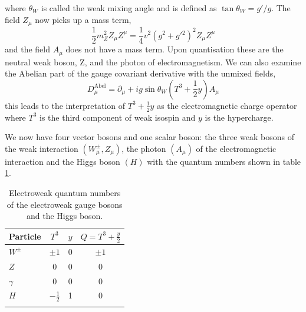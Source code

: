 where $\theta_{W}$ is called the weak mixing angle and is defined as $\tan{\theta_{W}} = g'/g$. The field $Z_{\mu}$ now picks up a mass term,
\begin{equation}
    \frac{1}{2} m_{Z}^{2} Z_{\mu} Z^{\mu} = \frac{1}{4}v^{2}(g^{2}+g'{^2})^{2}Z_{\mu}Z^{\mu}
    \label{eq:theory:Z_mass}
\end{equation}
and the field $A_{\mu}$ does not have a mass term. Upon quantisation these are the neutral weak boson, Z, and the photon of electromagnetism.
We can also examine the Abelian part of the gauge covariant derivative with the unmixed fields, 
\begin{equation}
    D_{\mu}^{\mathrm{Abel}} = \partial_{\mu} + ig\sin{\theta_{W}}(T^{3} + \frac{1}{2}y)A_{\mu}
    \label{eq:theory:charge_operator}
\end{equation}
this leads to the interpretation of $T^{3} + \frac{1}{2}y$ as the electromagnetic charge operator where $T^{3}$ is the third component of weak isospin and $y$ is the hypercharge.


We now have four vector bosons and one scalar boson: the three weak bosons of the weak interaction $(W_{\mu}^{\pm},Z_{\mu})$, the photon $(A_{\mu})$ of the electromagnetic interaction and the Higgs boson $(H)$ with the quantum numbers shown in table \ref{tab:theory:elecroweak_qn_bosons}.
\begin{table}[h!]
    \centering
\renewcommand{\arraystretch}{1.3}
\begin{tabular}{ l | c c c }
    \thickhline
    Particle & $T^{3}$ & $y$ & $Q = T^3 + \frac{y}{2}$ \\
    \hline
    $W^{\pm}$  & $\pm{1}$ & 0 & $\pm1$ \\
    $Z$    & 0 & 0 & 0 \\
    $\gamma$    & 0 & 0 & 0 \\
    $H$        & $-\frac{1}{2}$ & 1 & 0 \\
    \thickhline
\end{tabular}%
\caption{Electroweak quantum numbers of the electroweak gauge bosons and the Higgs boson.}
 \label{tab:theory:elecroweak_qn_bosons}
\end{table}

